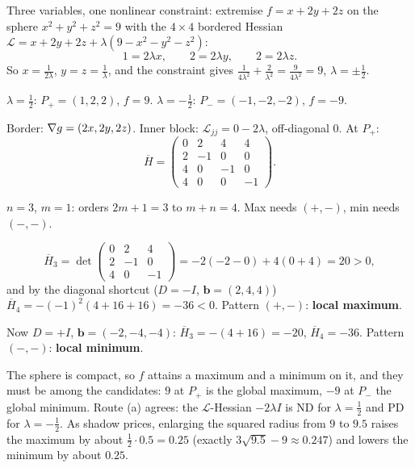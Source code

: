\begin{worked}{Three variables, one nonlinear constraint: extremise $f=x+2y+2z$ on the sphere $x^{2}+y^{2}+z^{2}=9$ with the $4\times4$ bordered Hessian}
 $\mathcal{L}=x+2y+2z+\lambda(9-x^{2}-y^{2}-z^{2})$:
\[
  1=2\lambda x,\qquad 2=2\lambda y,\qquad 2=2\lambda z .
\]
So $x=\tfrac1{2\lambda}$, $y=z=\tfrac1\lambda$, and the constraint gives
$\tfrac{1}{4\lambda^{2}}+\tfrac{2}{\lambda^{2}}=\tfrac{9}{4\lambda^{2}}=9$,
$\lambda=\pm\tfrac12$.

$\lambda=\tfrac12$: $P_+=(1,2,2)$, $f=9$. $\lambda=-\tfrac12$:
$P_-=(-1,-2,-2)$, $f=-9$.

 Border: $\nabla g=(2x,2y,2z)$. Inner block:
$\mathcal{L}_{jj}=0-2\lambda$, off-diagonal $0$. At $P_+$:
\[
  \overline{H}=\begin{pmatrix}0&2&4&4\\2&-1&0&0\\4&0&-1&0\\4&0&0&-1\end{pmatrix}.
\]

 $n=3$, $m=1$: orders $2m+1=3$ to $m+n=4$.
Max needs $(+,-)$, min needs $(-,-)$.

\[
  \overline{H}_3=\det\begin{pmatrix}0&2&4\\2&-1&0\\4&0&-1\end{pmatrix}
  =-2(-2-0)+4(0+4)=20>0 ,
\]
and by the diagonal shortcut ($D=-I$, $\mathbf{b}=(2,4,4)$)
$\overline{H}_4=-(-1)^{2}(4+16+16)=-36<0$. Pattern $(+,-)$:
\textbf{local maximum}.

 Now $D=+I$, $\mathbf{b}=(-2,-4,-4)$:
$\overline{H}_3=-(4+16)=-20$, $\overline{H}_4=-36$. Pattern $(-,-)$:
\textbf{local minimum}.

 The sphere is compact, so $f$
attains a maximum and a minimum on it, and they must be among the
candidates: $9$ at $P_+$ is the global maximum, $-9$ at $P_-$ the global
minimum. Route (a) agrees: the $\mathcal{L}$-Hessian $-2\lambda I$ is ND for
$\lambda=\tfrac12$ and PD for $\lambda=-\tfrac12$. As shadow prices,
enlarging the squared radius from $9$ to $9.5$ raises the maximum by about
$\tfrac12\cdot0.5=0.25$ (exactly $3\sqrt{9.5}-9\approx0.247$) and lowers the
minimum by about $0.25$.
\end{worked}

